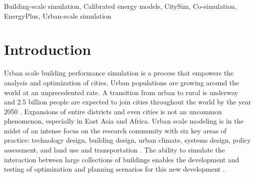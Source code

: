\documentclass{tBPS2e}
\theoremstyle{plain}
\theoremstyle{definition}
\theoremstyle{remark}
\begin{document}
\begin{abstract}

\end{abstract}

\begin{keywords}
Building-scale simulation, Calibrated energy models, CitySim, Co-simulation, EnergyPlus, Urban-scale simulation 
\end{keywords}

\linenumbers

\section{Introduction}

Urban scale building performance simulation is a process that empowers the
analysis and optimization of cities. Urban populations are growing around the
world at an unprecedented rate. A transition from urban to rural is underway and
2.5 billion people are expected to join cities throughout the world by the year 2050
\citep{united_nations_world_2014}. Expansions of entire districts and even cities
is not an uncommon phenomenon, especially in East Asia and Africa. Urban scale
modeling is in the midst of an intense focus on the research community with
six key areas of practice: technology design, building design, urban climate,
systems design, policy assessment, and land use and transportation
\citep{keirstead_review_2012}. The ability to simulate the interaction between
large collections of buildings enables the development and testing of
optimization and planning scenarios for this new development
\citep{dorer_modelling_2013}.
\end{document}
